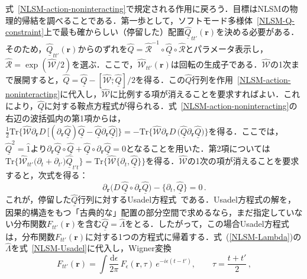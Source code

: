\documentclass[a4paper,11pt]{ltjsarticle}
\def\Tr{\mathrm{Tr}}
\def\d{\mathrm{d}}
\begin{document}
式~\eqref{NLSM-action-noninteracting}で規定される作用に戻ろう．目標はNLSMの物理的帰結を調べることである．第一歩として，ソフトモード多様体~\eqref{NLSM-Q-constraint}上で最も確からしい（停留した）配置$\underline{\hat{Q}}_{tt'}(\mathbf{r})$を決める必要がある．そのため，$\underline{\hat{Q}}_{tt'}(\mathbf{r})$からのずれを$\hat{Q}=\hat{\mathcal{R}}^{-1}\circ\underline{\hat{Q}}\circ\hat{\mathcal{R}}$とパラメータ表示し，$\hat{\mathcal{R}}=\exp(\hat{\mathcal{W}}/2)$を選ぶ．ここで，$\hat{\mathcal{W}}_{tt'}(\mathbf{r})$は回転の生成子である．$\hat{\mathcal{W}}$の1次まで展開すると，$\hat{Q}=\underline{\hat{Q}}-[\hat{\mathcal{W}}\stackrel{\circ}{,}\underline{\hat{Q}}]/2$を得る．この$\hat Q$行列を作用~\eqref{NLSM-action-noninteracting}に代入し，$\hat{\mathcal{W}}$に比例する項が消えることを要求すればよい．これにより，$\hat{\underline{Q}}$に対する鞍点方程式が得られる．式~\eqref{NLSM-action-noninteracting}の右辺の波括弧内の第1項からは，$\frac{1}{2}\Tr\big\{\hat{\mathcal{W}}\partial_{\mathbf{r}}
D\,\big[(\partial_{\mathbf{r}}\underline{\hat{Q}})
\underline{\hat{Q}}-\underline{\hat{Q}}
\partial_{\mathbf{r}}\underline{\hat{Q}}\big]\big\}=
-\Tr\big\{\hat{\mathcal{W}}\partial_{\mathbf{r}}
D\,\big(\underline{\hat{Q}}\partial_{\mathbf{r}}
\underline{\hat{Q}}\big)\big\}$を得る．ここでは，$\underline{\hat{Q}}^{2}=\hat{1}$より$\partial_{\mathbf{r}}\underline{\hat{Q}}\circ
\underline{\hat{Q}}+\underline{\hat{Q}}\circ
\partial_{\mathbf{r}}\underline{\hat{Q}}=0$となることを用いた．第2項については$\Tr\big\{\hat{\mathcal{W}}_{tt'}\big(\partial_{t}+\partial_{t'}\big)
\underline{\hat{Q}}_{t't}\big\}=
\Tr\big\{\hat{\mathcal{W}}\{\partial_{t},\underline{\hat{Q}}\}\big\}$を得る．$\hat{\mathcal{W}}$の1次の項が消えることを要求すると，次式を得る：
\begin{equation}\label{NLSM-Usadel}
\partial_{\mathbf{r}}
\big(D\,
\underline{\hat{Q}}\circ\partial_{\mathbf{r}}\underline{\hat{Q}}\big)-
\{\partial_{t},\underline{\hat{Q}}\}=0\,.
\end{equation}
これが，停留した$\underline{\hat{Q}}$行列に対するUsadel方程式~\cite{Usadel}である．Usadel方程式の解を，因果的構造をもつ「古典的な」配置の部分空間で求めるなら，まだ指定していない分布関数$F_{tt'}(\mathbf{r})$を含む$\underline{\hat{Q}}=\hat{\Lambda}$をとる．したがって，この場合Usadel方程式は，分布関数$F_{tt'}(\mathbf{r})$に対する1つの方程式に帰着する．式~(\ref{NLSM-Lambda})の$\hat{\Lambda}$を式~\eqref{NLSM-Usadel}に代入し，Wigner変換
\begin{equation}\label{NLSM-Wigner}
F_{tt'}(\mathbf{r})=\int\frac{\d\epsilon}{2\pi}\,F_{\epsilon}
\left(\mathbf{r},\tau\right)\,e^{-i\epsilon(t-t')},\quad \quad
\tau=\frac{t+t'}{2}\, ,
\end{equation}
\end{document}
